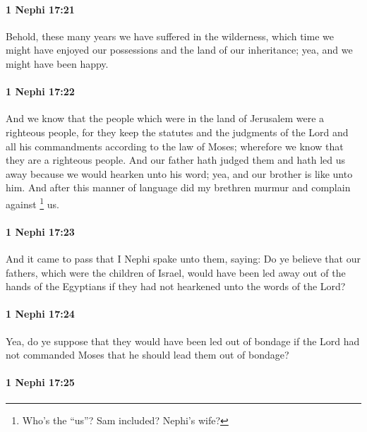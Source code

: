 		\paragraph{1 Nephi 17:21} %
			\label{1NEPHI-17-21}

			Behold, these many years we have suffered in the wilderness,
			which time we might have enjoyed our possessions
			and the land of our inheritance;
			yea, and we might have been happy.

		\paragraph{1 Nephi 17:22} %
			\label{1NEPHI-17-22}

			And we know that the people which were in the land of Jerusalem
			were a righteous people,
			for they keep the statutes and the judgments of the Lord
			and all his commandments according to the law of Moses;
			wherefore we know that they are a righteous people.
			And our father hath judged them
			and hath led us away because we would hearken unto his word;
			yea, and our brother is like unto him.
			And after this manner of language
			did my brethren murmur and complain against
				\footnote{%
					\label{1NEPHI-17-22-NOTE-us}%
					Who's the ``us''? Sam included? Nephi's wife?
					}%
			us.

		\paragraph{1 Nephi 17:23} %
			\label{1NEPHI-17-23}

			And it came to pass that I Nephi spake unto them, saying:
			Do ye believe that our fathers, which were the children of Israel,
			would have been led away out of the hands of the Egyptians
			if they had not hearkened unto the words of the Lord?

		\paragraph{1 Nephi 17:24} %
			\label{1NEPHI-17-24}

			Yea, do ye suppose that they would have been led out of bondage
			if the Lord had not commanded Moses
			that he should lead them out of bondage?

		\paragraph{1 Nephi 17:25} %
			\label{1NEPHI-17-25}


